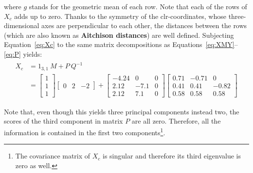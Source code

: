 \noindent where $g$ stands for the geometric mean of each row. Note
that each of the rows of $X_c$ adds up to zero. Thanks to the symmetry
of the clr-coordinates, whose three-dimensional axes are perpendicular
to each other, the distances between the rows (which are also known as
\textbf{Aitchison distances}) are well defined. Subjecting
Equation~\ref{eq:Xc} to the same matrix decompositions as
Equations~\ref{eq:XMY}--\ref{eq:P} yields:
\begin{align}
  \begin{split}
    X_c & = 1_{3,1}~M + P~Q^{-1} \\
    ~ & = 
    \left[
      \begin{array}{c}
        1 \\
        1 \\
        1
      \end{array}
      \right]
   \left[
    \begin{array}{ccc}
        0 & 2 & -2
      \end{array}
      \right]
    + 
     \left[
      \begin{array}{ccc}
        -4.24 &  0   & 0 \\
        2.12  & -7.1 & 0 \\
        2.12  &  7.1 & 0
      \end{array}
      \right]
    \left[
      \begin{array}{ccc}
        0.71 & -0.71 &  0 \\
        0.41 &  0.41 & -0.82 \\
        0.58 &  0.58 &  0.58
      \end{array}
      \right]
    \label{eq:PCAcomp}
  \end{split}
\end{align}

Note that, even though this yields three principal components instead
two, the scores of the third component in matrix $P$ are all zero.
Therefore, all the information is contained in the first two
components\footnote{The covariance matrix of $X_c$ is singular and
therefore its third eigenvalue is zero as well.}.

